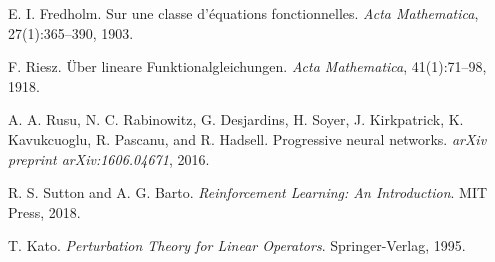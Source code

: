 \documentclass[11pt]{article}
\begin{document}

\begin{thebibliography}{99}

E. I. Fredholm.
\newblock Sur une classe d'équations fonctionnelles.
\newblock \emph{Acta Mathematica}, 27(1):365--390, 1903.

F. Riesz.
\newblock Über lineare Funktionalgleichungen.
\newblock \emph{Acta Mathematica}, 41(1):71--98, 1918.

A. A. Rusu, N. C. Rabinowitz, G. Desjardins, H. Soyer, J. Kirkpatrick, K. Kavukcuoglu, R. Pascanu, and R. Hadsell.
\newblock Progressive neural networks.
\newblock \emph{arXiv preprint arXiv:1606.04671}, 2016.

R. S. Sutton and A. G. Barto.
\newblock \emph{Reinforcement Learning: An Introduction}.
\newblock MIT Press, 2018.

T. Kato.
\newblock \emph{Perturbation Theory for Linear Operators}.
\newblock Springer-Verlag, 1995.

\end{thebibliography}
\end{document}
